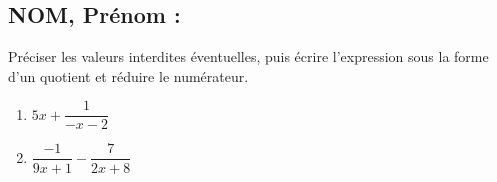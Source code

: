\documentclass[a4paper,11pt,exos]{nsi}
\begin{document}
\subsection*{NOM, Prénom : \dotfill} 


\maketitle




\begin{exercice}%
    Préciser les valeurs interdites éventuelles, puis écrire l'expression sous la forme d'un quotient et réduire le numérateur.
    \begin{multicols}{2}
    \begin{enumerate}
        \item $5x+\dfrac{1}{-x-2}$
        \item $\dfrac{-1}{9x+1}-\dfrac{7}{2x+8}$
    \end{enumerate}
    \end{multicols}
\end{exercice}

\end{document}
